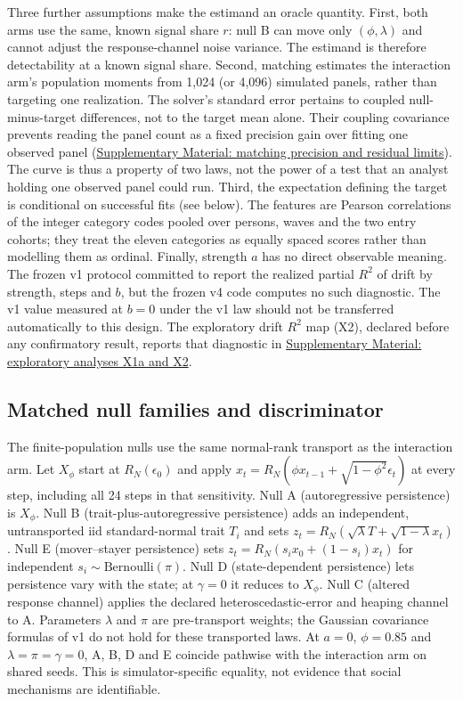 Three further assumptions make the estimand an oracle quantity. %
First, both arms use the same, known signal share $r$: null B can move only $(\phi,\lambda)$ and cannot adjust the response-channel noise variance. %
The estimand is therefore detectability at a known signal share. %
Second, matching estimates the interaction arm's population moments from 1,024 (or 4,096) simulated panels, rather than targeting one realization. The solver's standard error pertains to coupled null-minus-target differences, not to the target mean alone. Their coupling covariance prevents reading the panel count as a fixed precision gain over fitting one observed panel (\hyperref[supp:matching-scope]{Supplementary Material: matching precision and residual limits}). %
The curve is thus a property of two laws, not the power of a test that an analyst holding one observed panel could run. %
Third, the expectation defining the target is conditional on successful fits (see below). %
The features are Pearson correlations of the integer category codes pooled over persons, waves and the two entry cohorts; they treat the eleven categories as equally spaced scores rather than modelling them as ordinal. %
Finally, strength $a$ has no direct observable meaning. The frozen v1 protocol committed to report the realized partial $R^2$ of drift by strength, steps and $b$, but the frozen v4 code computes no such diagnostic. The v1 value measured at $b=0$ under the v1 law should not be transferred automatically to this design. The exploratory drift $R^2$ map (X2), declared before any confirmatory result, reports that diagnostic in \hyperref[supp:x1-x2]{Supplementary Material: exploratory analyses X1a and X2}. %

\subsection{Matched null families and discriminator}

The finite-population nulls use the same normal-rank transport as the interaction arm. %
Let $X_\phi$ start at $R_N(\epsilon_0)$ and apply $x_t=R_N(\phi x_{t-1}+\sqrt{1-\phi^2}\epsilon_t)$ at every step, including all 24 steps in that sensitivity. %
Null A (autoregressive persistence) is $X_\phi$. %
Null B (trait-plus-autoregressive persistence) adds an independent, untransported iid standard-normal trait $T_i$ and sets $z_t=R_N(\sqrt\lambda T+\sqrt{1-\lambda}x_t)$. %
Null E (mover--stayer persistence) sets $z_t=R_N(s_i x_0+(1-s_i)x_t)$ for independent $s_i\sim\mathrm{Bernoulli}(\pi)$. %
Null D (state-dependent persistence) lets persistence vary with the state; at $\gamma=0$ it reduces to $X_\phi$. %
Null C (altered response channel) applies the declared heteroscedastic-error and heaping channel to A. %
Parameters $\lambda$ and $\pi$ are pre-transport weights; the Gaussian covariance formulas of v1 do not hold for these transported laws. %
At $a=0$, $\phi=0.85$ and $\lambda=\pi=\gamma=0$, A, B, D and E coincide pathwise with the interaction arm on shared seeds. %
This is simulator-specific equality, not evidence that social mechanisms are identifiable. %

